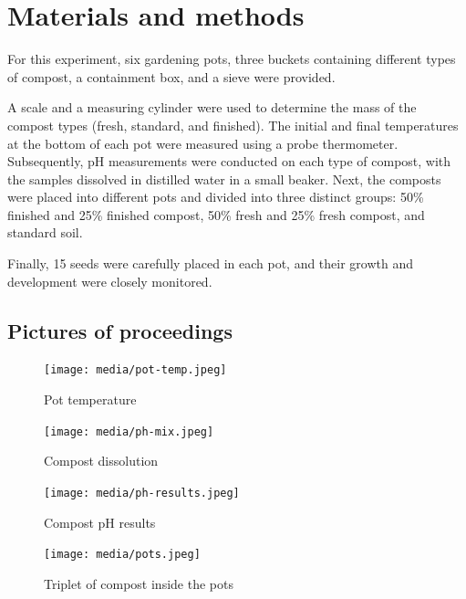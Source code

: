 \documentclass{article}
\begin{document}
\section{Materials and methods}
For this experiment, six gardening pots, three buckets containing different types of 
compost, a containment box, and a sieve were provided.

A scale and a measuring cylinder were used to determine the mass of the compost types
(fresh, standard, and finished). The initial and final temperatures at the bottom of each
pot were measured using a probe thermometer. Subsequently, pH measurements were conducted on each type of compost, with the samples
dissolved in distilled water in a small beaker. Next, the composts were placed into different pots and divided into three distinct
groups: 50\% finished and 25\% finished compost, 50\% fresh and 25\% fresh compost, and
standard soil.

Finally, 15 seeds were carefully placed in each pot, and their growth and development
were closely monitored.

\subsection{Pictures of proceedings}
\vspace*{.5cm}
\begin{figure}[ht!]
    \begin{minipage}[b]{0.5\textwidth}
        \centering
        \texttt{[image: media/pot-temp.jpeg]}
        \caption{Pot temperature}
    \end{minipage}%
    \hfill
    \begin{minipage}[b]{0.5\textwidth}
        \centering
        \texttt{[image: media/ph-mix.jpeg]}
        \caption{Compost dissolution}
    \end{minipage}%
\end{figure}
\vspace*{1cm}

\begin{figure}[ht!]
    \begin{minipage}[b]{0.5\textwidth}
        \centering
        \texttt{[image: media/ph-results.jpeg]}
        \caption{Compost pH results}
    \end{minipage}
    \hfill
    \begin{minipage}[b]{0.5\textwidth}
        \centering
        \texttt{[image: media/pots.jpeg]}
        \caption{Triplet of compost inside the pots}
    \end{minipage}
\end{figure}
\vspace*{.5cm}
\end{document}
